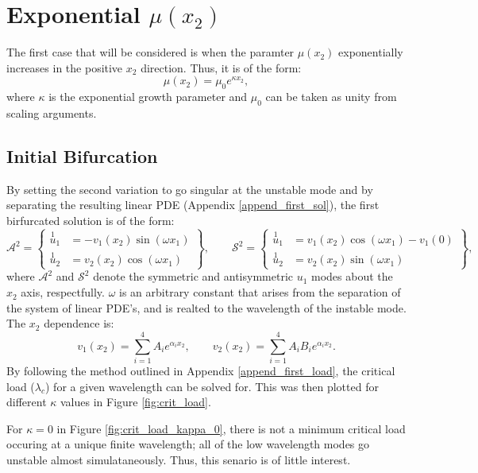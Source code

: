 \documentclass[11pt]{report}
\begin{document}
\chapter{Exponential $\mu(x_2)$}
The first case that will be considered is when the paramter $\mu(x_2)$ exponentially increases in the positive $x_2$ direction. Thus, it is of the form:
\begin{equation} \label{eq:mu_ex}
\mu(x_2) = \mu_0 e^{\kappa x_2},
\end{equation}
where $\kappa$ is the exponential growth parameter and $\mu_0$ can be taken as unity from scaling arguments.

\section{Initial Bifurcation}
By setting the second variation to go singular at the unstable mode and by separating the resulting linear PDE (Appendix \ref{append_first_sol}), the first birfurcated solution is of the form:
\begin{equation} \label{eq:first_bif_modes}
\mathcal{A}^2 =
\left \{
\begin{aligned}
  \overset{1}{u}_1 &= -v_1(x_2)\sin(\omega x_1) \\
  \overset{1}{u}_2 &=  v_2(x_2)\cos(\omega x_1)
\end{aligned}
\right \} , \qquad
\mathcal{S}^2 =
\left \{
\begin{aligned}
  \overset{1}{u}_1 &= v_1(x_2)\cos(\omega x_1) - v_1(0) \\
  \overset{1}{u}_2 &=  v_2(x_2)\sin(\omega x_1)
\end{aligned}
\right \},
\end{equation}
where $\mathcal{A}^2$ and $\mathcal{S}^2$ denote the symmetric and antisymmetric $u_1$ modes about the $x_2$ axis, respectfully. $\omega$ is an arbitrary constant that arises from the separation of the system of linear PDE's, and is realted to the wavelength of the instable mode. The $x_2$ dependence is:
\begin{equation}
v_1(x_2) = \sum_{i = 1}^{4}A_ie^{\alpha_i x_2}, \qquad v_2(x_2) = \sum_{i = 1}^{4} A_i B_i e^{\alpha_i x_2}.
\end{equation}
By following the method outlined in Appendix \ref{append_first_load}, the critical load ($\lambda_c$) for a given wavelength can be solved for. This was then plotted for different $\kappa$ values in Figure \ref{fig:crit_load}.

For $\kappa = 0$ in Figure \ref{fig:crit_load_kappa_0}, there is not a minimum critical load occuring at a unique finite wavelength; all of the low wavelength modes go unstable almost simulataneously. Thus, this senario is of little interest.
\end{document}
